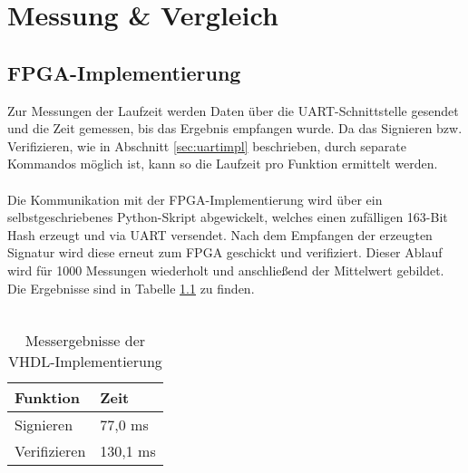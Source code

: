 
\chapter{Messung \& Vergleich} \label{sec:messung}

\section{FPGA-Implementierung}
Zur Messungen der Laufzeit werden Daten über die UART-Schnittstelle gesendet und die Zeit gemessen, bis das Ergebnis empfangen wurde. Da das Signieren bzw. Verifizieren, wie in Abschnitt \ref{sec:uartimpl} beschrieben, durch separate Kommandos möglich ist, kann so die Laufzeit pro Funktion ermittelt werden. 
\\ \\
Die Kommunikation mit der FPGA-Implementierung wird über ein selbstgeschriebenes Python-Skript abgewickelt, welches einen zufälligen 163-Bit Hash erzeugt und via UART versendet. Nach dem Empfangen der erzeugten Signatur wird diese erneut zum FPGA geschickt und verifiziert. Dieser Ablauf wird für 1000 Messungen wiederholt und anschließend der Mittelwert gebildet. Die Ergebnisse sind in Tabelle \ref{vhdl-messung} zu finden.
\\ \\
\begin{table}[h]
	\centering 
	\begin{tabular}{ | p{3cm} | p{6cm} | }
		\hline
		\textbf{Funktion} & \textbf{Zeit} \\
		\hline
		Signieren & 77,0 ms \\
		\hline
		Verifizieren & 130,1 ms \\
		\hline
	\end{tabular}
	\caption{Messergebnisse der VHDL-Implementierung}
	\label{vhdl-messung}
\end{table}


